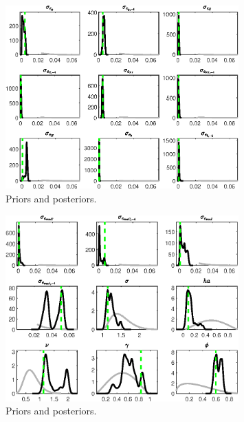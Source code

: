  
\begin{figure}[H]
\centering
\includegraphics[width=0.80\textwidth]{BRS_sectoral_KK/Output/BRS_sectoral_KK_PriorsAndPosteriors1}
\caption{Priors and posteriors.}\label{Fig:PriorsAndPosteriors:1}
\end{figure}
 
\begin{figure}[H]
\centering
\includegraphics[width=0.80\textwidth]{BRS_sectoral_KK/Output/BRS_sectoral_KK_PriorsAndPosteriors2}
\caption{Priors and posteriors.}\label{Fig:PriorsAndPosteriors:2}
\end{figure}
 

